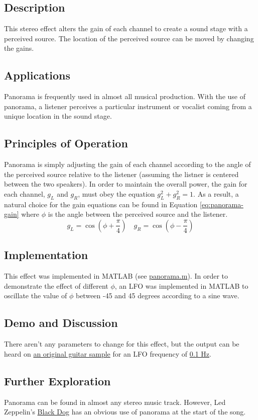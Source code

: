 \subsection{Description}
This stereo effect alters the gain of each channel to create a sound stage with a perceived source. The location of the perceived source can be moved by changing the gains.

\subsection{Applications}
Panorama is frequently used in almost all musical production. With the use of panorama, a listener perceives a particular instrument or vocalist coming from a unique location in the sound stage.

\subsection{Principles of Operation}
Panorama is simply adjusting the gain of each channel according to the angle of the perceived source relative to the listener (assuming the listner is centered between the two speakers). In order to maintain the overall power, the gain for each channel, $g_L$ and $g_R$, must obey the equation $g_L^2 + g_R^2 = 1$. As a result, a natural choice for the gain equations can be found in Equation \ref{eq:panorama-gain} where $\phi$ is the angle between the perceived source and the listener.
\begin{equation}
    g_L = \cos(\phi + \frac{\pi}{4}) \quad
    g_R = \cos(\phi - \frac{\pi}{4})
    \label{eq:panorama-gain}
\end{equation}

\subsection{Implementation}
This effect was implemented in MATLAB (see \href{run:../panorama.m}{panorama.m}). In order to demonstrate the effect of different $\phi$, an LFO was implemented in MATLAB to oscillate the value of $\phi$ between -45 and 45 degrees according to a sine wave.

\subsection{Demo and Discussion}
There aren't any parameters to change for this effect, but the output can be heard on \href{run:../InputAudio/22-004 Original Guitar.wav}{an original guitar sample} for an LFO frequency of \href{run:../OutputAudio/panorama_22-004 Original Guitar_{f_LFO=0.1Hz}.wav}{0.1 Hz}.

\subsection{Further Exploration}
Panorama can be found in almost any stereo music track. However, Led Zeppelin's \href{https://www.youtube.com/watch?v=F0YoKzsjE-0}{Black Dog} has an obvious use of panorama at the start of the song.